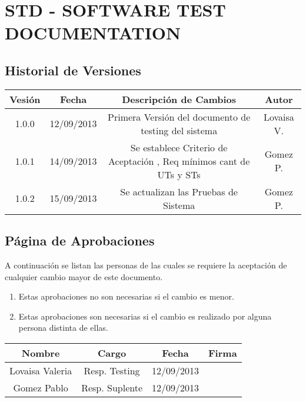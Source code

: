 \chapter{\textcolor[gray]{.8}{STD - SOFTWARE TEST DOCUMENTATION}}
\newpage
\section{\textcolor[gray]{.2}{Historial de Versiones}}
\begin{table}[!h]
\begin{center}
\begin{tabular}{|c|c|c|c|}
\hline
\rowcolor[gray]{.8} Vesión & Fecha & Descripción de Cambios & Autor\\
\hline
1.0.0 & 12/09/2013 & Primera Versión del documento de testing del sistema & Lovaisa V.\\
\hline
1.0.1 & 14/09/2013 & Se establece Criterio de Aceptación , Req mínimos cant de UTs y STs & Gomez P.\\
\hline
1.0.2 & 15/09/2013 & Se actualizan las Pruebas de Sistema & Gomez P.\\
\hline
\end{tabular}
\end{center}
\end{table}
\newpage

\section{\textcolor[gray]{.2}{Página de Aprobaciones}}
A continuación se listan las personas de las cuales se requiere la aceptación de cualquier cambio mayor de este documento.
\begin{enumerate}
  \item Estas aprobaciones no son necesarias si el cambio es menor.
  \item Estas aprobaciones son necesarias si el cambio es realizado por alguna
  persona distinta de ellas.
\end{enumerate}
\begin{table}[!h]
\begin{center}
\begin{tabular}{|c|c|c|c|}
\hline
\rowcolor[gray]{.8} Nombre & Cargo & Fecha & Firma\\
\hline
Lovaisa Valeria & Resp. Testing & 12/09/2013 & \\
\hline
Gomez Pablo & Resp. Suplente & 12/09/2013 & \\
\hline
\end{tabular}
\end{center}
\end{table}

